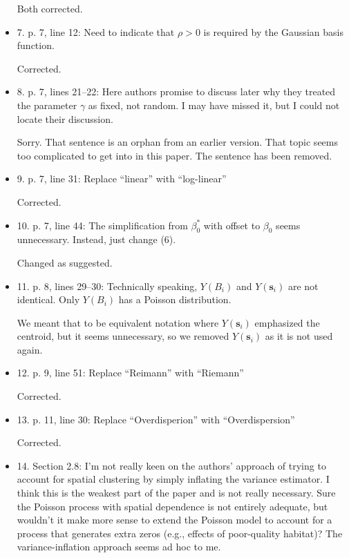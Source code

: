 \documentclass[12pt, titlepage]{article}
\def\bs{\textbf{s}}
\begin{document}
\begin{itemize}
  Both corrected.

\item {\color{red!70!black} 7. p. 7, line 12: Need to indicate that $\rho > 0$ is required by the Gaussian basis function. }

  Corrected.

\item {\color{red!70!black} 8. p. 7, lines 21--22: Here authors promise to discuss later why they treated the parameter $\gamma$ as fixed, not random. I may have missed it, but I could not locate their discussion.}

  Sorry.  That sentence is an orphan from an earlier version.  That topic seems too complicated to get into in this paper.  The sentence has been removed.

\item {\color{red!70!black} 9. p. 7, line 31: Replace ``linear'' with ``log-linear'' }

  Corrected.

\item {\color{red!70!black} 10. p. 7, line 44: The simplification from $\beta_0^*$ with offset to $\beta_0$ seems unnecessary. Instead, just change (6).}

  Changed as suggested.

\item {\color{red!70!black} 11. p. 8, lines 29--30: Technically speaking, $Y(B_i)$ and $Y(\bs_i)$ are not identical. Only $Y(B_i)$ has a Poisson distribution.}

  We meant that to be equivalent notation where $Y(\bs_i)$ emphasized the centroid, but it seems unnecessary, so we removed  $Y(\bs_i)$ as it is not used again.

\item {\color{red!70!black} 12. p. 9, line 51: Replace ``Reimann'' with ``Riemann''}

  Corrected.

\item {\color{red!70!black} 13. p. 11, line 30: Replace ``Overdisperion'' with ``Overdispersion''}

  Corrected.

\item {\color{red!70!black} 14. Section 2.8: I'm not really keen on the authors' approach of trying to account for spatial clustering by simply inflating the variance estimator. I think this is the weakest part of the paper and is not really necessary. Sure the Poisson process with spatial dependence is not entirely adequate, but wouldn't it make more sense to extend the Poisson model to account for a process that generates extra zeros (e.g., effects of poor-quality habitat)? The variance-inflation approach seems ad hoc to me.}


\end{itemize}
\end{document}
